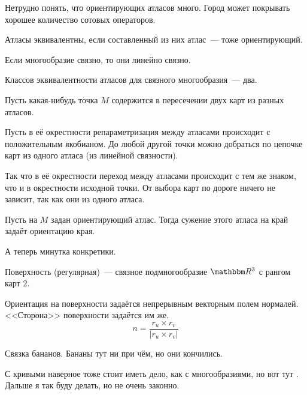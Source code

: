 \documentclass[12pt,draft,timbord]{longnotes}
\begin{document}
Нетрудно понять, что ориентирующих атласов много. Город может покрывать
хорошее количество сотовых операторов.

\begin{defn}\label{defn:dg::orient::atleq}
  Атласы эквивалентны, если составленный из них атлас~--- тоже ориентирующий.
\end{defn}

\begin{prop}\label{prop:dg::orient::conn}
  Если многообразие связно, то они линейно связно.
\end{prop}
\begin{prop}\label{prop:dg::orient::atlbin}
  Классов эквивалентности атласов для связного многообразия~--- два.
\end{prop}
\begin{lproof}[\quest]
  Пусть какая-нибудь точка $M$ содержится в пересечении двух карт из разных атласов.

  Пусть в её окрестности репараметризация между атласами происходит с положительным якобианом.
  До любой другой точки можно добраться по цепочке карт из одного атласа (из линейной связности).

  Так что в её окрестности переход между атласами происходит с тем же знаком, что и в окрестности
  исходной точки. От выбора карт по дороге ничего не зависит, так как они из одного атласа.
\end{lproof}

\begin{defn}\label{defn:dg::orient::edge}
  Пусть на $M$ задан ориентирующий атлас. 
  Тогда сужение этого атласа на край задаёт ориентацию края.
\end{defn}

А теперь минутка конкретики. 
\begin{defn}\label{defn:dg::orient::surf}
  Поверхность (регулярная)~--- связное \quest подмногообразие $\R^3$ с рангом карт $2$.
\end{defn}

\begin{prop}\label{prop:dg::orient::surfnorm}
  Ориентация на поверхности задаётся непрерывным векторным полем нормалей.
  <<Сторона>> поверхности задаётся им же.
  \[
    n= \frac{r_u \times r_v }{|r_u \times r_v|} 
  \]
\end{prop}
\begin{lproof}
  Связка бананов. Бананы тут ни при чём, но они кончились.
\end{lproof}

\begin{rem}\label{rem:dg::orient::curvesfolds}
  С кривыми наверное тоже стоит иметь дело, как с многообразиями, но вот тут \quest.
  Дальше я так буду делать, но не очень законно.
\end{rem}
\end{document}
